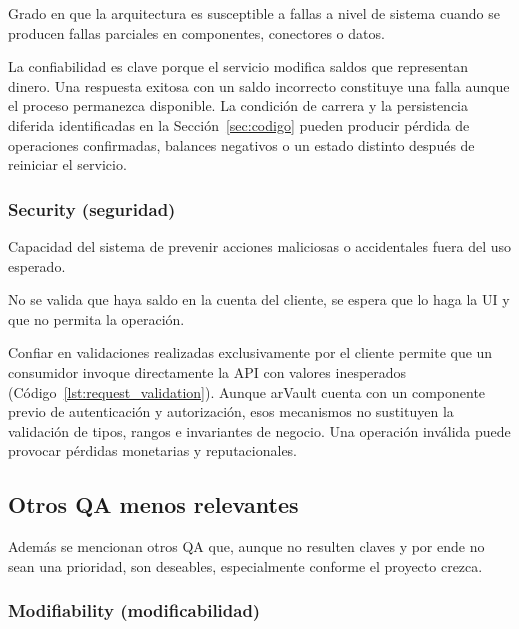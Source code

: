             Grado en que la arquitectura es susceptible a fallas a nivel de sistema cuando se producen fallas parciales en componentes, conectores o datos.

            La confiabilidad es clave porque el servicio modifica saldos que representan
            dinero. Una respuesta exitosa con un saldo incorrecto constituye una falla
            aunque el proceso permanezca disponible. La condición de carrera y la
            persistencia diferida identificadas en la Sección~\ref{sec:codigo} pueden
            producir pérdida de operaciones confirmadas, balances negativos o un estado
            distinto después de reiniciar el servicio.

        \subsubsection{Security (seguridad)}
        \label{sec:seguridad}

            Capacidad del sistema de prevenir acciones maliciosas o accidentales fuera del uso esperado.

            \begin{customenv}[frametitle=]
                No se valida que haya saldo en la cuenta del cliente, se espera que lo haga la UI y que no permita la operación.
            \end{customenv}

            Confiar en validaciones realizadas exclusivamente por el cliente permite que
            un consumidor invoque directamente la API con valores inesperados (Código~\ref{lst:request_validation}). Aunque arVault
            cuenta con un componente previo de autenticación y autorización, esos mecanismos no
            sustituyen la validación de tipos, rangos e invariantes de negocio. Una
            operación inválida puede provocar pérdidas monetarias y reputacionales.

    \subsection{Otros QA menos relevantes}
    \label{sec:otros_qa_menos_relevantes}

        Además se mencionan otros QA que, aunque no resulten claves y por ende no sean
        una prioridad, son deseables, especialmente conforme el proyecto crezca.

        \subsubsection{Modifiability (modificabilidad)}
        \label{sec:modificabilidad}

